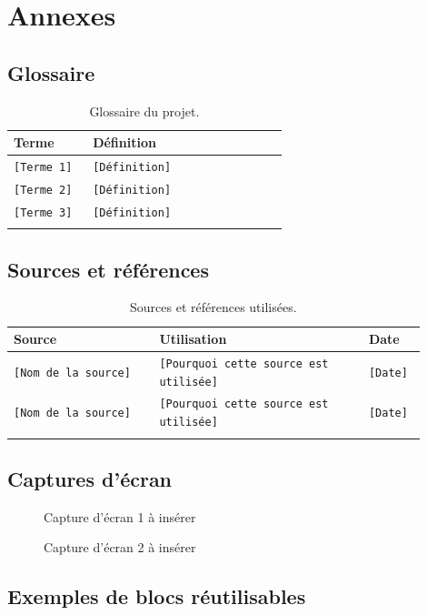 \documentclass[11pt,a4paper]{report}
\newcommand{\placeholder}[1]{\textcolor{placeholderColor}{\texttt{[#1]}}}
\newcommand{\imageplaceholder}[4][0.85\linewidth]{%
  \begin{figure}[H]
    \centering
    \fbox{%
      \begin{minipage}[c][#2][c]{#1}
        \centering
        \textcolor{midgray}{\Large Emplacement image}\\[0.4cm]
        \textcolor{midgray}{#3}
      \end{minipage}%
    }
    \caption{#3}
    \label{#4}
  \end{figure}
}
\begin{document}
\appendix
\chapter{Annexes}

\section{Glossaire}
\begin{longtable}{p{0.26\linewidth}p{0.64\linewidth}}
\toprule
\textbf{Terme} & \textbf{Définition} \\
\midrule
\endhead
\placeholder{Terme 1} & \placeholder{Définition} \\
\placeholder{Terme 2} & \placeholder{Définition} \\
\placeholder{Terme 3} & \placeholder{Définition} \\
\bottomrule
\caption{Glossaire du projet.}
\label{tab:glossaire}
\end{longtable}

\section{Sources et références}
\begin{longtable}{p{0.32\linewidth}p{0.46\linewidth}p{0.12\linewidth}}
\toprule
\textbf{Source} & \textbf{Utilisation} & \textbf{Date} \\
\midrule
\endhead
\placeholder{Nom de la source} & \placeholder{Pourquoi cette source est utilisée} & \placeholder{Date} \\
\placeholder{Nom de la source} & \placeholder{Pourquoi cette source est utilisée} & \placeholder{Date} \\
\bottomrule
\caption{Sources et références utilisées.}
\label{tab:sources}
\end{longtable}

\section{Captures d'écran}
\imageplaceholder{7cm}{Capture d'écran 1 à insérer}{fig:annexe-capture-1}
\imageplaceholder{7cm}{Capture d'écran 2 à insérer}{fig:annexe-capture-2}

\section{Exemples de blocs réutilisables}
\end{document}

